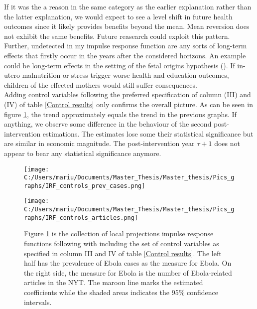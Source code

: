\documentclass{article}
\begin{document}
If it was the a reason in the same category as the earlier explanation rather than the latter explanation, we would expect to see a level shift in future health outcomes since it likely provides benefits beyond the mean. Mean reversion does not exhibit the same benefits. Future reasearch could exploit this pattern. Further, undetected in my impulse response function are any sorts of long-term effects that firstly occur in the years after the considered horizons. An example could be long-term effects in the setting of the fetal origins hypothesis (\cite{almond2011killing}). If in-utero malnutrition or stress trigger worse health and education outcomes, children of the effected mothers would still suffer consequences. \\
Adding control variables following the preferred specification of column (III) and (IV) of table \ref{Control results} only confirms the overall picture. As can be seen in figure \ref{First Stage IRF - with controls}, the trend approximately equals the trend in the previous graphs. If anything, we observe some difference in the behaviour of the second post-intervention estimations. The estimates lose some their statistical significance but are similar in economic magnitude. The post-intervention year $\tau + 1$ does not appear to bear any statistical significance anymore.

\begin{figure}[!ht]
\begin{minipage}[t]{0.5\linewidth}\vspace{0pt} 
\texttt{[image: C:/Users/mariu/Documents/Master\_Thesis/Master\_thesis/Pics\_graphs/IRF\_controls\_prev\_cases.png]}\\
\end{minipage}\hfill%
\begin{minipage}[t]{0.5\linewidth}\vspace{0pt} 
\texttt{[image: C:/Users/mariu/Documents/Master\_Thesis/Master\_thesis/Pics\_graphs/IRF\_controls\_articles.png]}\\
\end{minipage}\hfill%
\caption{Figure \ref{First Stage IRF - with controls} is the collection of local projections impulse response functions following \cite{jorda2005estimation} with including the set of control variables as specified in column III and IV of table \ref{Control results}. The left half has the prevalence of Ebola cases as the measure for Ebola. On the right side, the measure for Ebola is the number of Ebola-related articles in the NYT. The maroon line marks the estimated coefficients while the shaded areas indicates the 95\% confidence intervals.}
\label{First Stage IRF - with controls}
\end{figure}
\end{document}
